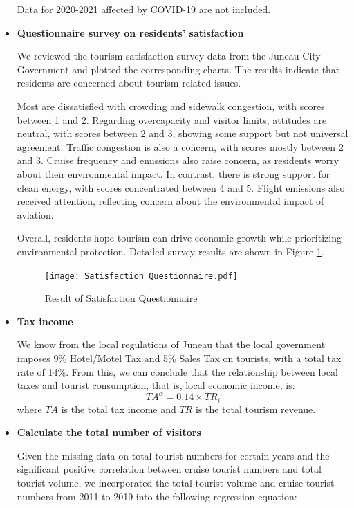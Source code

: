 \documentclass{mcmthesis}
\begin{document}
\begin{itemize}
\begin{table}[htbp]
  \vspace{0.5em}
  {\small\color{NoteColor}\raggedright 
    Data for 2020-2021 affected by COVID-19 are not included.
  }
\end{table}
  \item \textbf{Questionnaire survey on residents' satisfaction}\par
  We reviewed the tourism satisfaction survey data from the Juneau City Government\cite{4}
  and plotted the corresponding charts. The results indicate that residents are 
  concerned about tourism-related issues.\par Most are dissatisfied with crowding and 
  sidewalk congestion, with scores between 1 and 2. Regarding overcapacity and 
  visitor limits, attitudes are neutral, with scores between 2 and 3, showing some 
  support but not universal agreement. Traffic congestion is also a concern, with 
  scores mostly between 2 and 3. Cruise frequency and emissions also raise concern, 
  as residents worry about their environmental impact. In contrast, there is strong 
  support for clean energy, with scores concentrated between 4 and 5. Flight emissions 
  also received attention, reflecting concern about the environmental impact of 
  aviation.\par Overall, residents hope tourism can drive economic growth while prioritizing 
  environmental protection. Detailed survey results are shown in Figure \ref{fig:satisfy}.
  \begin{figure}[h] 
    \centering
    {\texttt{[image: Satisfaction Questionnaire.pdf]}} %
    \caption{Result of Satisfaction Questionnaire} \label{fig:satisfy}
  \end{figure}
  \item \textbf{Tax income}\par
  We know from the local regulations of Juneau that the local government imposes 9\% Hotel/Motel Tax and 5\% Sales Tax on tourists, with a total tax rate of 14\%.\cite{9} From this, we can conclude that the relationship between local taxes and tourist consumption, that is, local economic income, is:
  \begin{equation}
    \label{eq:tax}
    TA^\alpha = 0.14 \times TR_i
  \end{equation}
  where $TA$ is the total tax income and $TR$ is the total tourism revenue.
  \item \textbf{Calculate the total number of visitors}\par
  Given the missing data on total tourist numbers for certain years and the significant positive correlation between cruise tourist numbers and total tourist volume, we incorporated the total tourist volume and cruise tourist numbers from 2011 to 2019 into the following regression equation:


\end{itemize}
\end{document}

